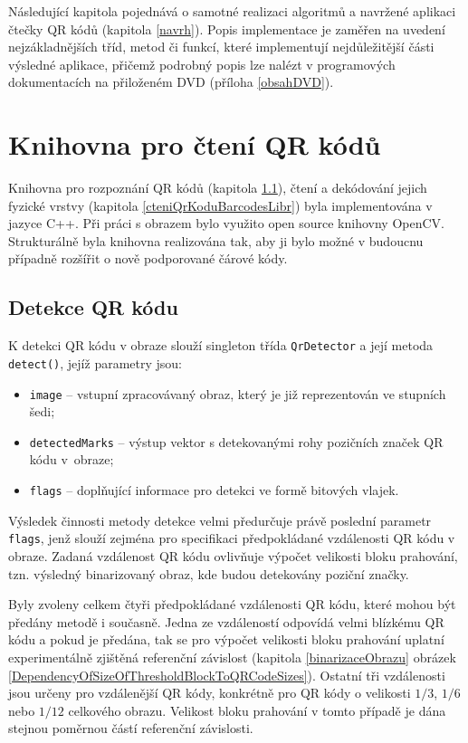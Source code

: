 Následující kapitola pojednává o samotné realizaci algoritmů a navržené 
aplikaci čtečky QR kódů (kapitola \ref{navrh}). Popis implementace je zaměřen na
uvedení nejzákladnějších tříd, metod či funkcí, které implementují nejdůležitější části
výsledné aplikace, přičemž podrobný popis lze nalézt v programových 
dokumentacích na přiloženém DVD (příloha \ref{obsahDVD}).

\section{Knihovna pro čtení QR kódů}
\label{knihovnaBarcodesLibrary}

Knihovna pro rozpoznání QR kódů (kapitola \ref{detekceQrKoduBarcodesLibr}),
čtení a dekódování jejich fyzické vrstvy (kapitola
\ref{cteniQrKoduBarcodesLibr}) byla implementována v jazyce C++.
Při práci s obrazem bylo využito open source knihovny OpenCV. Strukturálně byla
knihovna realizována tak, aby ji bylo možné v budoucnu případně rozšířit o
nově podporované čárové kódy.

\subsection{Detekce QR kódu}
\label{detekceQrKoduBarcodesLibr}

K detekci QR kódu v obraze slouží singleton třída \texttt{QrDetector} a její
metoda \texttt{detect()}, jejíž parametry jsou:

\begin{itemize}
  \item \texttt{image} -- vstupní zpracovávaný obraz, který je již reprezentován
  ve stupních šedi;
  \item \texttt{detectedMarks} -- výstup vektor s detekovanými rohy pozičních
  značek QR kódu v~obraze;
  \item \texttt{flags} -- doplňující informace pro detekci ve formě bitových
  vlajek.
\end{itemize}

Výsledek činnosti metody detekce velmi předurčuje právě poslední parametr
\texttt{flags}, jenž slouží zejména pro specifikaci předpokládané vzdálenosti QR
kódu v obraze. Zadaná vzdálenost QR kódu ovlivňuje výpočet velikosti bloku
prahování, tzn. výsledný binarizovaný obraz, kde budou detekovány poziční značky.

Byly zvoleny celkem čtyři předpokládané vzdálenosti QR kódu, které mohou být
předány metodě i současně. Jedna ze vzdáleností odpovídá velmi blízkému QR kódu
a pokud je předána, tak se pro výpočet velikosti bloku prahování uplatní
experimentálně zjištěná referenční závislost (kapitola \ref{binarizaceObrazu} obrázek
\ref{DependencyOfSizeOfThresholdBlockToQRCodeSizes}).
Ostatní tři vzdálenosti jsou určeny pro vzdálenější QR kódy, konkrétně pro QR kódy 
o velikosti $1/3$, $1/6$ nebo $1/12$ celkového obrazu. Velikost bloku prahování
v tomto případě je dána stejnou poměrnou částí referenční závislosti.

